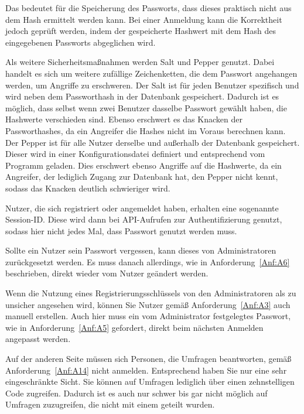 Das bedeutet für die Speicherung des Passworts, dass dieses praktisch nicht aus dem Hash ermittelt werden kann.
Bei einer Anmeldung kann die Korrektheit jedoch geprüft werden, indem der gespeicherte Hashwert mit dem Hash des eingegebenen Passworts abgeglichen wird.

Als weitere Sicherheitsmaßnahmen werden Salt und Pepper genutzt.
Dabei handelt es sich um weitere zufällige Zeichenketten, die dem Passwort angehangen werden, um Angriffe zu erschweren.
Der Salt ist für jeden Benutzer spezifisch und wird neben dem Passworthash in der Datenbank gespeichert.
Dadurch ist es möglich, dass selbst wenn zwei Benutzer dasselbe Passwort gewählt haben, die Hashwerte verschieden sind.
Ebenso erschwert es das Knacken der Passworthashes, da ein Angreifer die Hashes nicht im Voraus berechnen kann.
Der Pepper ist für alle Nutzer derselbe und außerhalb der Datenbank gespeichert.
Dieser wird in einer Konfigurationsdatei definiert und entsprechend vom Programm geladen.
Dies erschwert ebenso Angriffe auf die Hashwerte, da ein Angreifer, der lediglich Zugang zur Datenbank hat, den Pepper nicht kennt, sodass das Knacken deutlich schwieriger wird.

Nutzer, die sich registriert oder angemeldet haben, erhalten eine sogenannte Session-ID.
Diese wird dann bei \acs{API}-Aufrufen zur Authentifizierung genutzt, sodass hier nicht jedes Mal, dass Passwort genutzt werden muss.

Sollte ein Nutzer sein Passwort vergessen, kann dieses von Administratoren zurückgesetzt werden.
Es muss danach allerdings, wie in Anforderung~\ref{Anf:A6} beschrieben, direkt wieder vom Nutzer geändert werden.

Wenn die Nutzung eines Registrierungsschlüssels von den Administratoren als zu unsicher angesehen wird, können Sie Nutzer gemäß Anforderung~\ref{Anf:A3} auch manuell erstellen.
Auch hier muss ein vom Administrator festgelegtes Passwort, wie in Anforderung~\ref{Anf:A5} gefordert, direkt beim nächsten Anmelden angepasst werden.

Auf der anderen Seite müssen sich Personen, die Umfragen beantworten, gemäß Anforderung~\ref{Anf:A14} nicht anmelden.
Entsprechend haben Sie nur eine sehr eingeschränkte Sicht.
Sie können auf Umfragen lediglich über einen zehnstelligen Code zugreifen.
Dadurch ist es auch nur schwer bis gar nicht möglich auf Umfragen zuzugreifen, die nicht mit einem geteilt wurden.
